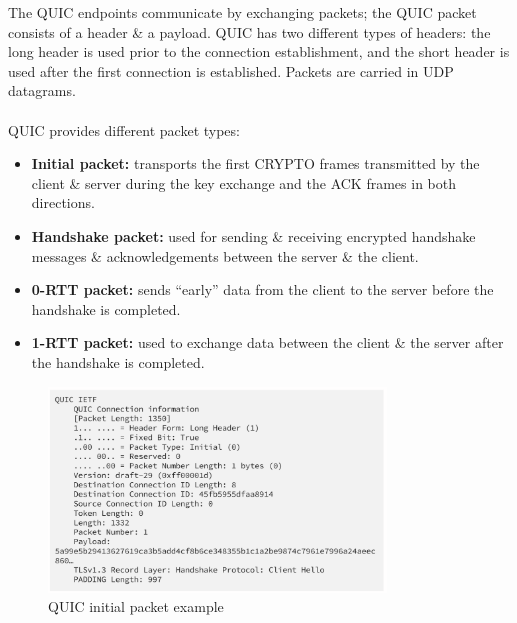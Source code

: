 \documentclass[a4paper,11pt]{article}
\begin{document}
The QUIC endpoints communicate by exchanging packets;
the QUIC packet consists of a header \& a payload.
QUIC has two different types of headers: the long header is used prior to the connection establishment, and the short header is used after the first connection is established.
Packets are carried in UDP datagrams.
\\\\
QUIC provides different packet types:
\begin{itemize}
    \item   \textbf{Initial packet:} transports the first CRYPTO frames transmitted by the client \& server during the key exchange and the ACK frames in both directions.
    \item   \textbf{Handshake packet:} used for sending \& receiving encrypted handshake messages \& acknowledgements between the server \& the client.
    \item   \textbf{0-RTT packet:} sends ``early'' data from the client to the server before the handshake is completed.
    \item   \textbf{1-RTT packet:} used to exchange data between the client \& the server after the handshake is completed.
\end{itemize}

\begin{figure}[H]
    \centering
    \includegraphics[width=0.8\textwidth]{./images/quickinitalpacket.png}
    \caption{QUIC initial packet example}
\end{figure}
\end{document}
